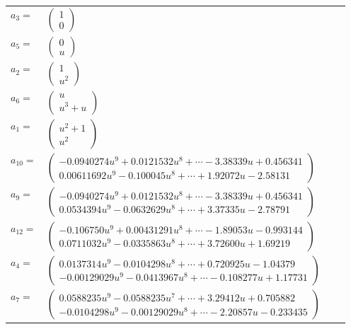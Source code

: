 \documentclass[1p]{elsarticle_modified}
\theoremstyle{definition}
\begin{document}
\begin{tabular}{m{7pt} m{180pt} m{7pt} m{180pt} }
\flushright $a_{3}=$&$\begin{pmatrix}1\\0\end{pmatrix}$ \\
\flushright $a_{5}=$&$\begin{pmatrix}0\\u\end{pmatrix}$ \\
\flushright $a_{2}=$&$\begin{pmatrix}1\\u^2\end{pmatrix}$ \\
\flushright $a_{6}=$&$\begin{pmatrix}u\\u^3+u\end{pmatrix}$ \\
\flushright $a_{1}=$&$\begin{pmatrix}u^2+1\\u^2\end{pmatrix}$ \\
\flushright $a_{10}=$&$\begin{pmatrix}-0.0940274 u^{9}+0.0121532 u^{8}+\cdots-3.38339 u+0.456341\\0.00611692 u^{9}-0.100045 u^{8}+\cdots+1.92072 u-2.58131\end{pmatrix}$ \\
\flushright $a_{9}=$&$\begin{pmatrix}-0.0940274 u^{9}+0.0121532 u^{8}+\cdots-3.38339 u+0.456341\\0.0534394 u^{9}-0.0632629 u^{8}+\cdots+3.37335 u-2.78791\end{pmatrix}$ \\
\flushright $a_{12}=$&$\begin{pmatrix}-0.106750 u^{9}+0.00431291 u^{8}+\cdots-1.89053 u-0.993144\\0.0711032 u^{9}-0.0335863 u^{8}+\cdots+3.72600 u+1.69219\end{pmatrix}$ \\
\flushright $a_{4}=$&$\begin{pmatrix}0.0137314 u^{9}-0.0104298 u^{8}+\cdots+0.720925 u-1.04379\\-0.00129029 u^{9}-0.0413967 u^{8}+\cdots-0.108277 u+1.17731\end{pmatrix}$ \\
\flushright $a_{7}=$&$\begin{pmatrix}0.0588235 u^{9}-0.0588235 u^{7}+\cdots+3.29412 u+0.705882\\-0.0104298 u^{9}-0.00129029 u^{8}+\cdots-2.20857 u-0.233435\end{pmatrix}$ \\

\end{tabular}
\end{document}
